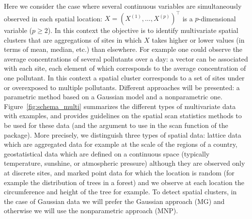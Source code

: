Here we consider the case where several continuous variables are simultaneously observed in each spatial location: $X = (X^{(1)}, \dots, X^{(p)})^\top$ is a $p$-dimensional variable ($p \ge 2$). In this context the objective is to identify multivariate spatial clusters that are aggregations of sites in which $X$ takes higher or lower values (in terms of mean, median, etc.) than elsewhere. For example one could observe the average concentrations of several pollutants over a day: a vector can be associated with each site, each element of which corresponds to the average concentration of one pollutant. In this context a spatial cluster corresponds to a set of sites under or overexposed to multiple pollutants. Different approaches will be presented: a parametric method based on a Gaussian model and a nonparametric one. \\ %
Figure~\ref{fig:schema_multi} summarizes the different types of multivariate data with examples, and provides guidelines on the spatial scan statistics methods to be used for these data (and the argument to use in the scan function of the package). More precisely, we distinguish three types of spatial data: lattice data which are aggregated data for example at the scale of the regions of a country, geostatistical data which are defined on a continuous space (typically temperature, sunshine, or atmospheric pressure) although they are observed only at discrete sites, and marked point data for which the location is random (for example the distribution of trees in a forest) and we observe at each location the circumference and height of the tree for example. To detect spatial clusters, in the case of Gaussian data we will prefer the Gaussian approach (MG) and otherwise we will use the nonparametric approach (MNP).\\

